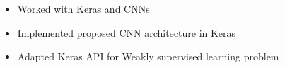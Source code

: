 \begin{itemize}
	\item Worked with Keras and CNNs
    \item Implemented proposed CNN architecture in Keras
    \item Adapted Keras API for Weakly supervised learning problem
\end{itemize}
